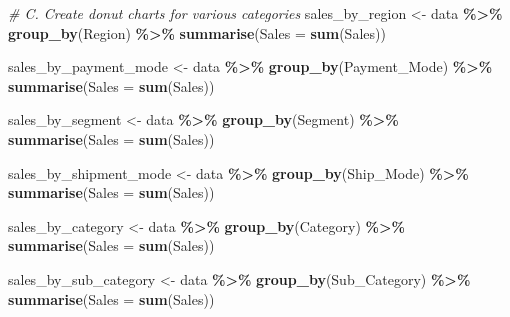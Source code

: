 \documentclass[
]{article}
\newenvironment{Shaded}{\begin{snugshade}}{\end{snugshade}}
\newcommand{\AttributeTok}[1]{\textcolor[rgb]{0.13,0.29,0.53}{#1}}
\newcommand{\CommentTok}[1]{\textcolor[rgb]{0.56,0.35,0.01}{\textit{#1}}}
\newcommand{\FunctionTok}[1]{\textcolor[rgb]{0.13,0.29,0.53}{\textbf{#1}}}
\newcommand{\NormalTok}[1]{#1}
\newcommand{\OtherTok}[1]{\textcolor[rgb]{0.56,0.35,0.01}{#1}}
\newcommand{\SpecialCharTok}[1]{\textcolor[rgb]{0.81,0.36,0.00}{\textbf{#1}}}
\begin{document}
\begin{Shaded}
\begin{Highlighting}[]
\CommentTok{\# C. Create donut charts for various categories}
\NormalTok{sales\_by\_region }\OtherTok{\textless{}{-}}\NormalTok{ data }\SpecialCharTok{\%\textgreater{}\%}
  \FunctionTok{group\_by}\NormalTok{(Region) }\SpecialCharTok{\%\textgreater{}\%}
  \FunctionTok{summarise}\NormalTok{(}\AttributeTok{Sales =} \FunctionTok{sum}\NormalTok{(Sales))}

\NormalTok{sales\_by\_payment\_mode }\OtherTok{\textless{}{-}}\NormalTok{ data }\SpecialCharTok{\%\textgreater{}\%}
  \FunctionTok{group\_by}\NormalTok{(Payment\_Mode) }\SpecialCharTok{\%\textgreater{}\%}
  \FunctionTok{summarise}\NormalTok{(}\AttributeTok{Sales =} \FunctionTok{sum}\NormalTok{(Sales))}

\NormalTok{sales\_by\_segment }\OtherTok{\textless{}{-}}\NormalTok{ data }\SpecialCharTok{\%\textgreater{}\%}
  \FunctionTok{group\_by}\NormalTok{(Segment) }\SpecialCharTok{\%\textgreater{}\%}
  \FunctionTok{summarise}\NormalTok{(}\AttributeTok{Sales =} \FunctionTok{sum}\NormalTok{(Sales))}

\NormalTok{sales\_by\_shipment\_mode }\OtherTok{\textless{}{-}}\NormalTok{ data }\SpecialCharTok{\%\textgreater{}\%}
  \FunctionTok{group\_by}\NormalTok{(Ship\_Mode) }\SpecialCharTok{\%\textgreater{}\%}
  \FunctionTok{summarise}\NormalTok{(}\AttributeTok{Sales =} \FunctionTok{sum}\NormalTok{(Sales))}

\NormalTok{sales\_by\_category }\OtherTok{\textless{}{-}}\NormalTok{ data }\SpecialCharTok{\%\textgreater{}\%}
  \FunctionTok{group\_by}\NormalTok{(Category) }\SpecialCharTok{\%\textgreater{}\%}
  \FunctionTok{summarise}\NormalTok{(}\AttributeTok{Sales =} \FunctionTok{sum}\NormalTok{(Sales))}

\NormalTok{sales\_by\_sub\_category }\OtherTok{\textless{}{-}}\NormalTok{ data }\SpecialCharTok{\%\textgreater{}\%}
  \FunctionTok{group\_by}\NormalTok{(Sub\_Category) }\SpecialCharTok{\%\textgreater{}\%}
  \FunctionTok{summarise}\NormalTok{(}\AttributeTok{Sales =} \FunctionTok{sum}\NormalTok{(Sales))}



\end{Highlighting}
\end{Shaded}
\end{document}
